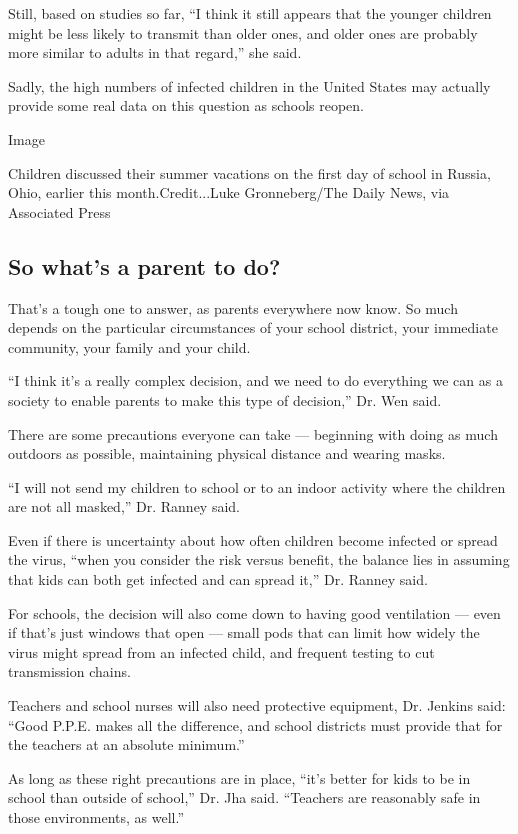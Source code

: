 Still, based on studies so far, ``I think it still appears that the
younger children might be less likely to transmit than older ones, and
older ones are probably more similar to adults in that regard,'' she
said.

Sadly, the high numbers of infected children in the United States may
actually provide some real data on this question as schools reopen.

Image

Children discussed their summer vacations on the first day of school in
Russia, Ohio, earlier this month.Credit...Luke Gronneberg/The Daily
News, via Associated Press

\hypertarget{so-whats-a-parent-to-do}{%
\subsection{So what's a parent to do?}\label{so-whats-a-parent-to-do}}

That's a tough one to answer, as parents everywhere now know. So much
depends on the particular circumstances of your school district, your
immediate community, your family and your child.

``I think it's a really complex decision, and we need to do everything
we can as a society to enable parents to make this type of decision,''
Dr. Wen said.

There are some precautions everyone can take --- beginning with doing as
much outdoors as possible, maintaining physical distance and wearing
masks.

``I will not send my children to school or to an indoor activity where
the children are not all masked,'' Dr. Ranney said.

Even if there is uncertainty about how often children become infected or
spread the virus, ``when you consider the risk versus benefit, the
balance lies in assuming that kids can both get infected and can spread
it,'' Dr. Ranney said.

For schools, the decision will also come down to having good ventilation
--- even if that's just windows that open --- small pods that can limit
how widely the virus might spread from an infected child, and frequent
testing to cut transmission chains.

Teachers and school nurses will also need protective equipment, Dr.
Jenkins said: ``Good P.P.E. makes all the difference, and school
districts must provide that for the teachers at an absolute minimum.''

As long as these right precautions are in place, ``it's better for kids
to be in school than outside of school,'' Dr. Jha said. ``Teachers are
reasonably safe in those environments, as well.''

